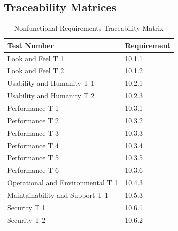 \documentclass[12pt, titlepage]{article}
\begin{document}
\subsection*{Traceability Matrices}
\begin{table}[H]
	\caption{Nonfunctional Requirements Traceability Matrix} \label{TraceMatrix2}
	\begin{tabular}{ll}
		\toprule
		\textbf{Test Number} & \textbf{Requirement} \\
		\midrule
		Look and Feel T 1 & 10.1.1\\
		Look and Feel T 2 & 10.1.2\\
		\midrule
		Usability and Humanity T 1 & 10.2.1\\
		Usability and Humanity T 2 & 10.2.3\\
		\midrule
		Performance T 1 & 10.3.1\\
		Performance T 2 & 10.3.2\\
		Performance T 3 & 10.3.3\\
		Performance T 4 & 10.3.4\\
		Performance T 5 & 10.3.5\\
		Performance T 6 & 10.3.6\\
		\midrule
		Operational and Environmental T 1 & 10.4.3\\
		\midrule
		Maintainability and Support T 1 & 10.5.3\\
		\midrule
		Security T 1 & 10.6.1\\
		Security T 2 & 10.6.2\\
		\bottomrule
	\end{tabular}
\end{table}
\end{document}
